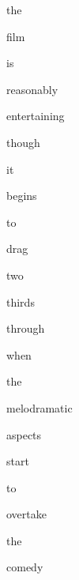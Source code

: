 \documentclass[varwidth]{standalone}
\begin{document}
\begin{CJK*}{UTF8}{gbsn}
{\setlength{\fboxsep}{0pt}\colorbox{white!0}{\parbox{0.8\textwidth}{
\colorbox{red!12.89524}{\strut the} \colorbox{red!12.791196}{\strut film} \colorbox{red!4.9860806}{\strut is} \colorbox{red!11.576382}{\strut reasonably} \colorbox{blue!13.122864}{\strut entertaining} \colorbox{red!19.2303}{\strut though} \colorbox{red!4.796516}{\strut it} \colorbox{red!30.859413}{\strut begins} \colorbox{red!0.68088317}{\strut to} \colorbox{red!24.619133}{\strut drag} \colorbox{red!11.582205}{\strut two} \colorbox{red!8.557351}{\strut thirds} \colorbox{red!13.219282}{\strut through} \colorbox{red!0.97397685}{\strut when} \colorbox{red!6.355854}{\strut the} \colorbox{red!38.55148}{\strut melodramatic} \colorbox{red!6.1039376}{\strut aspects} \colorbox{red!19.049177}{\strut start} \colorbox{red!3.149822}{\strut to} \colorbox{red!23.863108}{\strut overtake} \colorbox{red!10.206303}{\strut the} \colorbox{red!7.71556}{\strut comedy} 
}}}
\end{CJK*}
\end{document}

